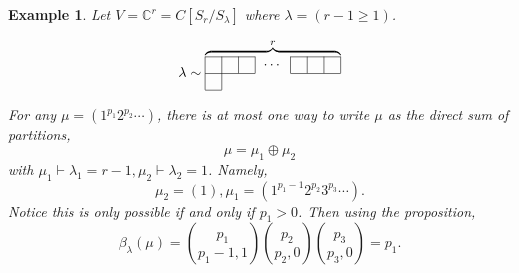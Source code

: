 \documentclass[10pt]{article}
\newtheorem{example}{Example}[section]
\numberwithin{equation}{theorem}
\newcommand{\C}[0]{\mathbb{C}}
\begin{document}
\begin{example}
  Let $V =\C^r = C[S_r/S_\lambda]$ where $\lambda = (r-1\geq 1)$.
  \begin{center}
    \[
    \lambda \sim\overbrace{
  \begin{tabular}{|l|llllll}
\cline{1-3} \cline{5-7}
 & \multicolumn{1}{l|}{} & \multicolumn{1}{l|}{} & \multicolumn{1}{l|}{$\cdots$} & \multicolumn{1}{l|}{} & \multicolumn{1}{l|}{} & \multicolumn{1}{l|}{} \\ \cline{1-3} \cline{5-7} 
 &                       &                       &                               &                       &                       &                       \\ \cline{1-1}
\end{tabular}
    }^{r}
\]
  \end{center} 
  For any $\mu = (1^{p_1}2^{p_2}\cdots)$, there is at most one way to write $\mu$ as the direct sum of partitions,
  \begin{equation*}
    \mu = \mu_1\oplus\mu_2
  \end{equation*} 
  with $\mu_1 \vdash \lambda_1 = r-1, \mu_2 \vdash \lambda_2 = 1$. Namely, 
  \begin{equation*}
    \mu_2 = (1),\mu_1 = (1^{p_1-1}2^{p_2}3^{p_3}\cdots).
  \end{equation*}
  Notice this is only possible if and only if $p_1>0$. Then using the proposition,
  \begin{equation*}
    \beta_\lambda(\mu) = {p_1 \choose p_1-1,1}{p_2\choose p_2,0}{p_3\choose p_3,0} = p_1.
  \end{equation*}
\end{example}
\end{document}
